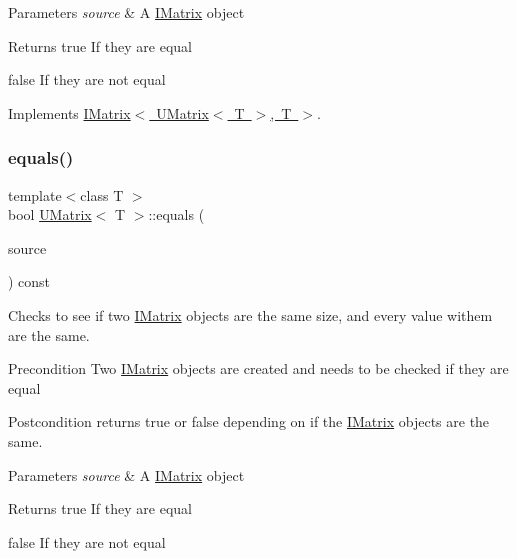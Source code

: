 \begin{DoxyParams}{Parameters}
{\em source} & A \mbox{\hyperlink{class_i_matrix}{I\+Matrix}} object \\
\hline
\end{DoxyParams}
\begin{DoxyReturn}{Returns}
true If they are equal 

false If they are not equal 
\end{DoxyReturn}


Implements \mbox{\hyperlink{class_i_matrix_afa03122ed7ddb531656ce27690f8fb03}{I\+Matrix$<$ U\+Matrix$<$ T $>$, T $>$}}.

\mbox{\label{class_u_matrix_a1bd38490c7258573ddd303fe41b2d36d}} 
\subsubsection{\texorpdfstring{equals()}{equals()}\hspace{0.1cm}{\footnotesize\ttfamily [5/6]}}
{\footnotesize\ttfamily template$<$class T $>$ \\
bool \mbox{\hyperlink{class_u_matrix}{U\+Matrix}}$<$ T $>$\+::equals (\begin{DoxyParamCaption}\item[{const \mbox{\hyperlink{class_i_matrix}{I\+Matrix}}$<$ \mbox{\hyperlink{class_s_matrix}{S\+Matrix}}$<$ T $>$, T $>$ \&}]{source }\end{DoxyParamCaption}) const}



Checks to see if two \mbox{\hyperlink{class_i_matrix}{I\+Matrix}} objects are the same size, and every value withem are the same. 

\begin{DoxyPrecond}{Precondition}
Two \mbox{\hyperlink{class_i_matrix}{I\+Matrix}} objects are created and needs to be checked if they are equal 
\end{DoxyPrecond}
\begin{DoxyPostcond}{Postcondition}
returns true or false depending on if the \mbox{\hyperlink{class_i_matrix}{I\+Matrix}} objects are the same.
\end{DoxyPostcond}

\begin{DoxyParams}{Parameters}
{\em source} & A \mbox{\hyperlink{class_i_matrix}{I\+Matrix}} object \\
\hline
\end{DoxyParams}
\begin{DoxyReturn}{Returns}
true If they are equal 

false If they are not equal 
\end{DoxyReturn}
\mbox{\label{class_u_matrix_ac6de19bd23b538a291c01dc2f330d450}} 
